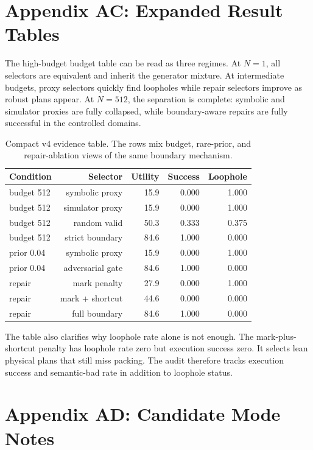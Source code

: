 \documentclass{article}
\begin{document}
\section*{Appendix AC: Expanded Result Tables}

The high-budget budget table can be read as three regimes. At $N=1$, all
selectors are equivalent and inherit the generator mixture. At intermediate
budgets, proxy selectors quickly find loopholes while repair selectors improve
as robust plans appear. At $N=512$, the separation is complete: symbolic and
simulator proxies are fully collapsed, while boundary-aware repairs are fully
successful in the controlled domains.

\begin{table}[t]
\centering
\small
\begin{tabular}{lrrrr}
\toprule
Condition & Selector & Utility & Success & Loophole \\
\midrule
budget 512 & symbolic proxy & 15.9 & 0.000 & 1.000 \\
budget 512 & simulator proxy & 15.9 & 0.000 & 1.000 \\
budget 512 & random valid & 50.3 & 0.333 & 0.375 \\
budget 512 & strict boundary & 84.6 & 1.000 & 0.000 \\
prior 0.04 & symbolic proxy & 15.9 & 0.000 & 1.000 \\
prior 0.04 & adversarial gate & 84.6 & 1.000 & 0.000 \\
repair & mark penalty & 27.9 & 0.000 & 1.000 \\
repair & mark + shortcut & 44.6 & 0.000 & 0.000 \\
repair & full boundary & 84.6 & 1.000 & 0.000 \\
\bottomrule
\end{tabular}
\caption{Compact v4 evidence table. The rows mix budget, rare-prior, and
repair-ablation views of the same boundary mechanism.}
\label{tab:compactv4}
\end{table}

The table also clarifies why loophole rate alone is not enough. The
mark-plus-shortcut penalty has loophole rate zero but execution success zero.
It selects lean physical plans that still miss packing. The audit therefore
tracks execution success and semantic-bad rate in addition to loophole status.

\section*{Appendix AD: Candidate Mode Notes}
\end{document}
